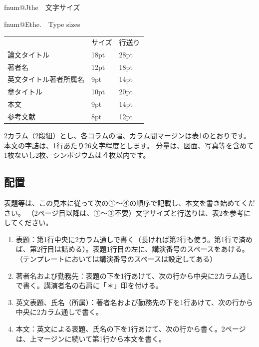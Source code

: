 \documentclass[uplatex,dvipdfmx,ja=standard,twocolumn]{bxjsarticle}
\makeatletter
\newcommand{\ieejcaption}[2]{%
\stepcounter{\@captype}
\par
\fontsize{8pt}{0pt}\selectfont
\csname fnum@J\@captype\endcsname \csname the\@captype\endcsname　#1\par
\csname fnum@E\@captype\endcsname \csname the\@captype\endcsname.　#2\par
}
\makeatother
\begin{document}
\vspace{-13pt}

\begin{table}[h]
  \fontsize{8pt}{10pt}\selectfont
  \centering
  \ieejcaption{文字サイズ}{Type sizes}
  \begin{tabular}{lll}
    \hline
                           & サイズ & 行送り\\
    論文タイトル           & 18pt   & 28pt\\
    著者名                 & 12pt   & 18pt\\
    英文タイトル著者所属名 &  9pt   & 14pt\\
    章タイトル             & 10pt   & 20pt\\
    本文                   &  9pt   & 14pt\\
    参考文献               &  8pt   & 12pt\\
    \hline
  \end{tabular}
\end{table}

\vspace{-10pt}

2カラム（2段組）とし、各コラムの幅、カラム間マージンは表1のとおりです。
本文の字詰は、1行あたり26文字程度とします。
分量は、図面、写真等を含めて1枚ないし2枚、シンポジウムは４枚以内です。

\subsection{配置}

表題等は、この見本に従って次の①～④の順序で記載し、本文を書き始めてください。
（2ページ目以降は、①～③不要）文字サイズと行送りは、表2を参考にしてください。

\begin{enumerate}
  \item 表題：第1行中央に2カラム通しで書く（長ければ第2行も使う。第1行で済めば、第2行目は詰める）。表題1行目の左に、講演番号のスペースをあける。（テンプレートにおいては講演番号のスペースは設定してある）
  \item 著者名および勤務先：表題の下を1行あけて、次の行から中央に2カラム通しで書く。講演者名の右肩に「＊」印を付ける。
  \item 英文表題、氏名（所属）：著者名および勤務先の下を1行あけて、次の行から中央に2カラム通しで書く。
  \item 本文：英文による表題、氏名の下を1行あけて、次の行から書く。2ページは、上マージンに続いて第1行から本文を書く。
\end{enumerate}
\end{document}
